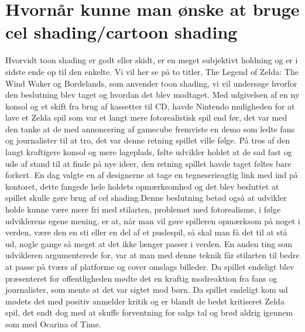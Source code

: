 \newpage
\section{Hvornår kunne man ønske at bruge cel shading/cartoon shading}

Hvorvidt toon shading er godt eller skidt, er en meget subjektivt holdning og er i sidste ende op til den enkelte. Vi vil her se på to titler, The Legend of Zelda: The Wind Waker og Bordelands, som anvender toon shading, vi vil undersøge hvorfor den beslutning blev taget og hvordan det blev modtaget. Med udgivelsen af en ny konsol og et skift fra brug af kassetter til CD, havde Nintendo muligheden for at lave et Zelda spil som var et langt mere fotorealistisk spil end før, det var med den tanke at de med annoncering af gamecube fremviste en demo \cite{Zelda}som ledte fans og journalister til at tro, det var denne retning spillet ville følge. På tros af den langt kraftigere konsol og mere lageplads, følte udvikler holdet at de sad fast og ude af stand til at finde på nye \cite{Zelda}ideer, den retning spillet havde taget føltes bare forkert. En dag valgte en af designerne at tage en  tegneserieagtig \cite{ToonLinkIsBorn}link med ind på kontoret, dette fangede hele holdets opmærksomhed og det blev besluttet at spillet skulle gøre brug af cel shading.Denne beslutning betød også at udvikler holde kunne være mere fri med stilarten, problemet med fotorealisme, i følge udviklerens egene mening, er at, når man vil gøre spilleren opmærksom på noget i verden, være den en sti eller en del af et puslespil, så skal man få det til at stå ud, nogle gange så meget at det ikke længer passer i verden. En anden ting som udvikleren argumenterede for, var at man med denne teknik får stilarten til bedre at passe på tværs af platforme og cover omslags \cite{nintendo}billeder. Da spillet endeligt blev præsenteret for offentligheden mødte det en kraftig modreaktion fra fans og journalister, som mente at det var sigtet mod 
\cite{nintendo}børn. Da spillet endeligt kom ud mødets det med positiv\cite{BigScore} anmelder kritik og er blandt de bedst kritiseret Zelda spil, det endt dog med at skuffe forventning for salgs tal og brød aldrig igennem som med Ocarina of Time.